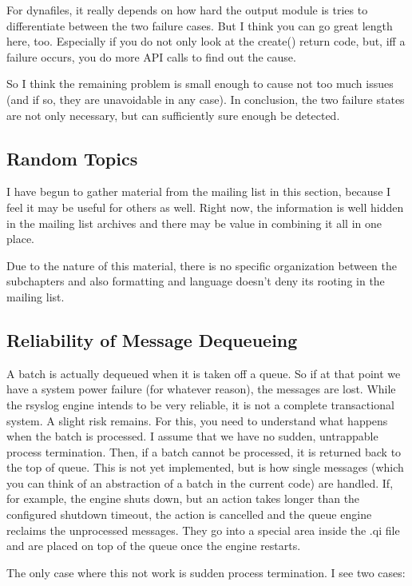 \documentclass[a4paper,10pt]{article}
\begin{document}
For dynafiles, it really depends on how hard the output module is tries to differentiate
between the two failure cases. But I think you can go great length here, too.
Especially if you do not only look at the create() return code, but, iff a
failure occurs, you do more API calls to find out the cause.

So I think the remaining problem is small enough to cause not too much issues
(and if so, they are unavoidable in any case). In conclusion, the two failure states are not only necessary, but can sufficiently sure enough be detected.

\subsection{Random Topics}
I have begun to gather material from the mailing list in this section, because I feel it may be useful for others as well. Right now, the information is well hidden in the mailing list archives and there may be value in combining it all in one place.

Due to the nature of this material, there is no specific organization between the subchapters and also formatting and language doesn't deny its rooting in the mailing list.

\subsection{Reliability of Message Dequeueing}
A batch is actually dequeued when it is taken off a queue. So if at that point we
have a system power failure (for whatever reason), the messages are lost.
While the rsyslog engine intends to be very reliable, it is not a complete
transactional system. A slight risk remains. For this, you need to understand
what happens when the batch is processed. I assume that we have no sudden,
untrappable process termination. Then, if a batch cannot be processed, it is
returned back to the top of queue. This is not yet implemented, but is how
single messages (which you can think of an abstraction of a batch in the
current code) are handled. If, for example, the engine shuts down, but an
action takes longer than the configured shutdown timeout, the action is
cancelled and the queue engine reclaims the unprocessed messages. They go
into a special area inside the .qi file and are placed on top of the queue
once the engine restarts.

The only case where this not work is sudden process termination. I see two
cases:
\end{document}
